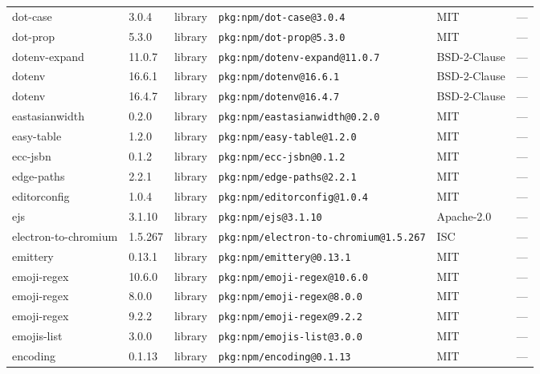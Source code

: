 \documentclass[11pt,a4paper]{article}
\begin{document}
\begin{longtable}{|p{4cm}|p{2cm}|p{1.6cm}|p{5cm}|p{1.5cm}|p{3.5cm}|}
\raggedright dot-case & 3.0.4 & library & \small\texttt{pkg:npm/dot-case@3.0.4} & MIT & \small — \\
\raggedright dot-prop & 5.3.0 & library & \small\texttt{pkg:npm/dot-prop@5.3.0} & MIT & \small — \\
\raggedright dotenv-expand & 11.0.7 & library & \small\texttt{pkg:npm/dotenv-expand@11.0.7} & BSD-2-Clause & \small — \\
\raggedright dotenv & 16.6.1 & library & \small\texttt{pkg:npm/dotenv@16.6.1} & BSD-2-Clause & \small — \\
\raggedright dotenv & 16.4.7 & library & \small\texttt{pkg:npm/dotenv@16.4.7} & BSD-2-Clause & \small — \\
\raggedright eastasianwidth & 0.2.0 & library & \small\texttt{pkg:npm/eastasianwidth@0.2.0} & MIT & \small — \\
\raggedright easy-table & 1.2.0 & library & \small\texttt{pkg:npm/easy-table@1.2.0} & MIT & \small — \\
\raggedright ecc-jsbn & 0.1.2 & library & \small\texttt{pkg:npm/ecc-jsbn@0.1.2} & MIT & \small — \\
\raggedright edge-paths & 2.2.1 & library & \small\texttt{pkg:npm/edge-paths@2.2.1} & MIT & \small — \\
\raggedright editorconfig & 1.0.4 & library & \small\texttt{pkg:npm/editorconfig@1.0.4} & MIT & \small — \\
\raggedright ejs & 3.1.10 & library & \small\texttt{pkg:npm/ejs@3.1.10} & Apache-2.0 & \small — \\
\raggedright electron-to-chromium & 1.5.267 & library & \small\texttt{pkg:npm/electron-to-chromium@1.5.267} & ISC & \small — \\
\raggedright emittery & 0.13.1 & library & \small\texttt{pkg:npm/emittery@0.13.1} & MIT & \small — \\
\raggedright emoji-regex & 10.6.0 & library & \small\texttt{pkg:npm/emoji-regex@10.6.0} & MIT & \small — \\
\raggedright emoji-regex & 8.0.0 & library & \small\texttt{pkg:npm/emoji-regex@8.0.0} & MIT & \small — \\
\raggedright emoji-regex & 9.2.2 & library & \small\texttt{pkg:npm/emoji-regex@9.2.2} & MIT & \small — \\
\raggedright emojis-list & 3.0.0 & library & \small\texttt{pkg:npm/emojis-list@3.0.0} & MIT & \small — \\
\raggedright encoding & 0.1.13 & library & \small\texttt{pkg:npm/encoding@0.1.13} & MIT & \small — \\

\end{longtable}
\end{document}
